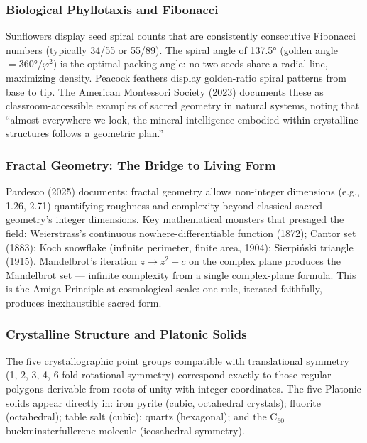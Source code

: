 \documentclass[11pt,letterpaper]{article}
\begin{document}
\subsubsection{Biological Phyllotaxis and Fibonacci}

Sunflowers display seed spiral counts that are consistently consecutive Fibonacci numbers (typically 34/55 or 55/89). The spiral angle of 137.5° (golden angle $= 360°/\varphi^2$) is the optimal packing angle: no two seeds share a radial line, maximizing density. Peacock feathers display golden-ratio spiral patterns from base to tip. The American Montessori Society (2023) documents these as classroom-accessible examples of sacred geometry in natural systems, noting that ``almost everywhere we look, the mineral intelligence embodied within crystalline structures follows a geometric plan.''

\subsubsection{Fractal Geometry: The Bridge to Living Form}

Pardesco (2025) documents: fractal geometry allows non-integer dimensions (e.g., 1.26, 2.71) quantifying roughness and complexity beyond classical sacred geometry's integer dimensions. Key mathematical monsters that presaged the field: Weierstrass's continuous nowhere-differentiable function (1872); Cantor set (1883); Koch snowflake (infinite perimeter, finite area, 1904); Sierpi\'{n}ski triangle (1915). Mandelbrot's iteration $z \to z^2 + c$ on the complex plane produces the Mandelbrot set --- infinite complexity from a single complex-plane formula. This is the Amiga Principle at cosmological scale: one rule, iterated faithfully, produces inexhaustible sacred form.

\subsubsection{Crystalline Structure and Platonic Solids}

The five crystallographic point groups compatible with translational symmetry (1, 2, 3, 4, 6-fold rotational symmetry) correspond exactly to those regular polygons derivable from roots of unity with integer coordinates. The five Platonic solids appear directly in: iron pyrite (cubic, octahedral crystals); fluorite (octahedral); table salt (cubic); quartz (hexagonal); and the C$_{60}$ buckminsterfullerene molecule (icosahedral symmetry).
\end{document}
